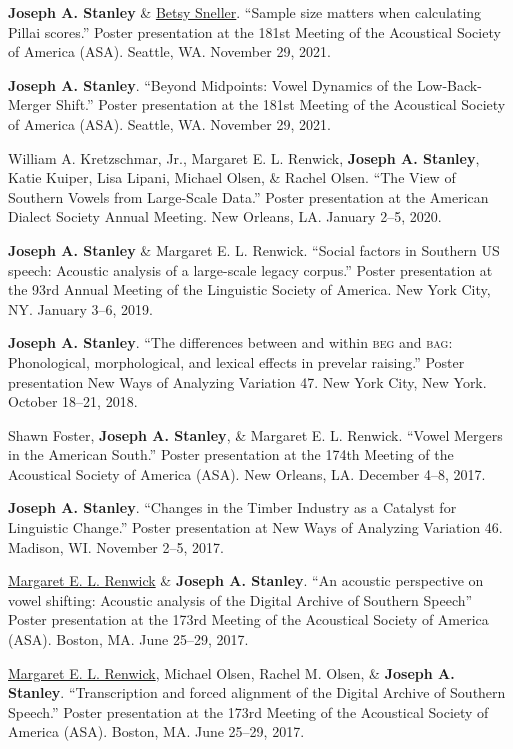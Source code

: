 \documentclass[
]{article}
\begin{document}
\textbf{Joseph A. Stanley} \&
\href{https://betsysneller.github.io}{Betsy Sneller}. ``Sample size
matters when calculating Pillai scores.'' Poster presentation at the
181st Meeting of the Acoustical Society of America (ASA). Seattle, WA.
November 29, 2021.

\textbf{Joseph A. Stanley}. ``Beyond Midpoints: Vowel Dynamics of the
Low-Back-Merger Shift.'' Poster presentation at the 181st Meeting of the
Acoustical Society of America (ASA). Seattle, WA. November 29, 2021.

William A. Kretzschmar, Jr., Margaret E. L. Renwick, \textbf{Joseph A.
Stanley}, Katie Kuiper, Lisa Lipani, Michael Olsen, \& Rachel Olsen.
``The View of Southern Vowels from Large-Scale Data.'' Poster
presentation at the American Dialect Society Annual Meeting. New
Orleans, LA. January 2--5, 2020.

\textbf{Joseph A. Stanley} \& Margaret E. L. Renwick. ``Social factors
in Southern US speech: Acoustic analysis of a large-scale legacy
corpus.'' Poster presentation at the 93rd Annual Meeting of the
Linguistic Society of America. New York City, NY. January 3--6, 2019.

\textbf{Joseph A. Stanley}. ``The differences between and within
\textsc{beg} and \textsc{bag}: Phonological, morphological, and lexical
effects in prevelar raising.'' Poster presentation New Ways of Analyzing
Variation 47. New York City, New York. October 18--21, 2018.

{Shawn Foster}, \textbf{Joseph A. Stanley}, \& Margaret E. L. Renwick.
``Vowel Mergers in the American South.'' Poster presentation at the
174th Meeting of the Acoustical Society of America (ASA). New Orleans,
LA. December 4--8, 2017.

\textbf{Joseph A. Stanley}. ``Changes in the Timber Industry as a
Catalyst for Linguistic Change.'' Poster presentation at New Ways of
Analyzing Variation 46. Madison, WI. November 2--5, 2017.

\href{http://faculty.franklin.uga.edu/mrenwick/}{Margaret E. L. Renwick}
\& \textbf{Joseph A. Stanley}. ``An acoustic perspective on vowel
shifting: Acoustic analysis of the Digital Archive of Southern Speech''
Poster presentation at the 173rd Meeting of the Acoustical Society of
America (ASA). Boston, MA. June 25--29, 2017.

\href{http://faculty.franklin.uga.edu/mrenwick/}{Margaret E. L.
Renwick}, Michael Olsen, Rachel M. Olsen, \& \textbf{Joseph A. Stanley}.
``Transcription and forced alignment of the Digital Archive of Southern
Speech.'' Poster presentation at the 173rd Meeting of the Acoustical
Society of America (ASA). Boston, MA. June 25--29, 2017.
\end{document}
